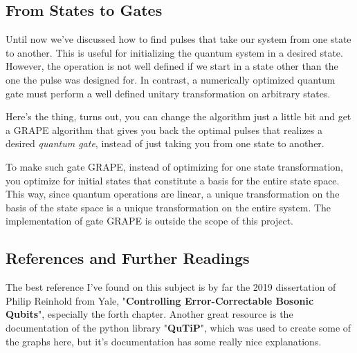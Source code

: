 \subsection{From States to Gates}\label{sec:gate-GRAPE}
Until now we've discussed how to find pulses that take our system from one state to another. This is useful for initializing the quantum system in a desired state. However, the operation is not well defined if we start in a state other than the one the pulse was designed for. In contrast, a  numerically optimized quantum gate must perform a well defined unitary transformation on arbitrary states.

Here's the thing, turns out, you can change the algorithm just a little bit and get a GRAPE algorithm that gives you back the optimal pulses that realizes a desired \textit{quantum gate}, instead of just taking you from one state to another. 

To make such gate GRAPE, instead of optimizing for one state transformation, you optimize for  initial states that constitute a basis for the entire state space. This way, since quantum operations are linear, a unique transformation on the basis of the state space is a unique transformation on the entire system. The implementation of gate GRAPE is outside the scope of this project.

\subsection{References and Further Readings}
The best reference I've found on this subject is by far the 2019 dissertation of Philip Reinhold from Yale, "\textbf{Controlling Error-Correctable Bosonic Qubits}", especially the forth chapter. Another great resource is the documentation of the python library "\textbf{QuTiP}", which was used to create some of the graphs here, but it's documentation has some really nice explanations.
